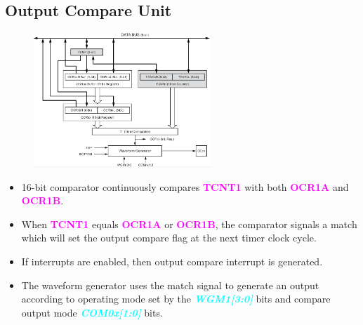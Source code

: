 \documentclass{article}
\newcommand{\bitFormat}[1]{\emph{\textbf{\textcolor{cyan}{#1}}}}
\newcommand{\regFormat}[1]{\textbf{\textcolor{magenta}{#1}}}
\begin{document}
\subsection{Output Compare Unit}
\begin{figure}[H]
    \begin{center}
        \includegraphics[width=0.6\textwidth]{Timer1OutputCompare.png}
    \end{center}
\end{figure}
\begin{itemize}
    \item 16-bit comparator continuously compares \regFormat{TCNT1} with both \regFormat{OCR1A} and \regFormat{OCR1B}.
    \item When \regFormat{TCNT1} equals \regFormat{OCR1A} or \regFormat{OCR1B}, the comparator signals a match which will set the output compare flag at the next timer clock cycle.
    \item If interrupts are enabled, then output compare interrupt is generated.
    \item The waveform generator uses the match signal to generate an output according to operating mode set by the \bitFormat{WGM1[3:0]} bits and compare output mode \bitFormat{COM0x[1:0]} bits.
\end{itemize}
\end{document}
